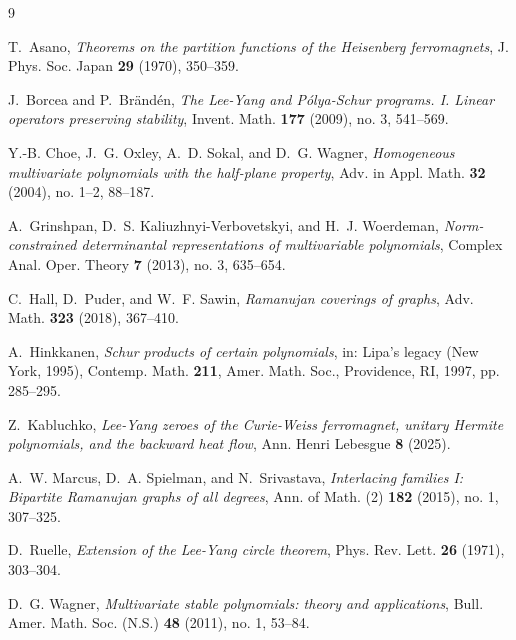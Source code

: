 \documentclass[11pt]{amsart}
\theoremstyle{definition}
\theoremstyle{remark}
\begin{document}
\begin{thebibliography}{9}

T.~Asano,
\emph{Theorems on the partition functions of the Heisenberg ferromagnets},
J. Phys. Soc. Japan \textbf{29} (1970), 350--359.

J.~Borcea and P.~Br\"and\'en,
\emph{The Lee-Yang and P\'olya-Schur programs. I. Linear operators preserving stability},
Invent. Math. \textbf{177} (2009), no. 3, 541--569.

Y.-B. Choe, J.~G. Oxley, A.~D. Sokal, and D.~G. Wagner,
\emph{Homogeneous multivariate polynomials with the half-plane property},
Adv. in Appl. Math. \textbf{32} (2004), no. 1--2, 88--187.

A.~Grinshpan, D.~S. Kaliuzhnyi-Verbovetskyi, and H.~J. Woerdeman,
\emph{Norm-constrained determinantal representations of multivariable polynomials},
Complex Anal. Oper. Theory \textbf{7} (2013), no. 3, 635--654.

C.~Hall, D.~Puder, and W.~F. Sawin,
\emph{Ramanujan coverings of graphs},
Adv. Math. \textbf{323} (2018), 367--410.

A.~Hinkkanen,
\emph{Schur products of certain polynomials},
in: Lipa's legacy (New York, 1995), Contemp. Math. \textbf{211}, Amer. Math. Soc., Providence, RI, 1997, pp. 285--295.

Z.~Kabluchko,
\emph{Lee-Yang zeroes of the Curie-Weiss ferromagnet, unitary Hermite polynomials, and the backward heat flow},
Ann. Henri Lebesgue \textbf{8} (2025).

A.~W. Marcus, D.~A. Spielman, and N.~Srivastava,
\emph{Interlacing families I: Bipartite Ramanujan graphs of all degrees},
Ann. of Math. (2) \textbf{182} (2015), no. 1, 307--325.

D.~Ruelle,
\emph{Extension of the Lee-Yang circle theorem},
Phys. Rev. Lett. \textbf{26} (1971), 303--304.

D.~G. Wagner,
\emph{Multivariate stable polynomials: theory and applications},
Bull. Amer. Math. Soc. (N.S.) \textbf{48} (2011), no. 1, 53--84.

\end{thebibliography}
\end{document}
